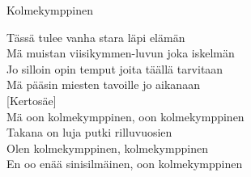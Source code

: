 \begin{song}{Kolmekymppinen}

    Tässä tulee vanha stara läpi elämän\\
    Mä muistan viisikymmen-luvun joka iskelmän\\
    Jo silloin opin temput joita täällä tarvitaan\\
    Mä pääsin miesten tavoille jo aikanaan\\

    [Kertosäe]\\
    Mä oon kolmekymppinen, oon kolmekymppinen\\
    Takana on luja putki rilluvuosien\\
    Olen kolmekymppinen, kolmekymppinen\\
    En oo enää sinisilmäinen, oon kolmekymppinen\\

\end{song}